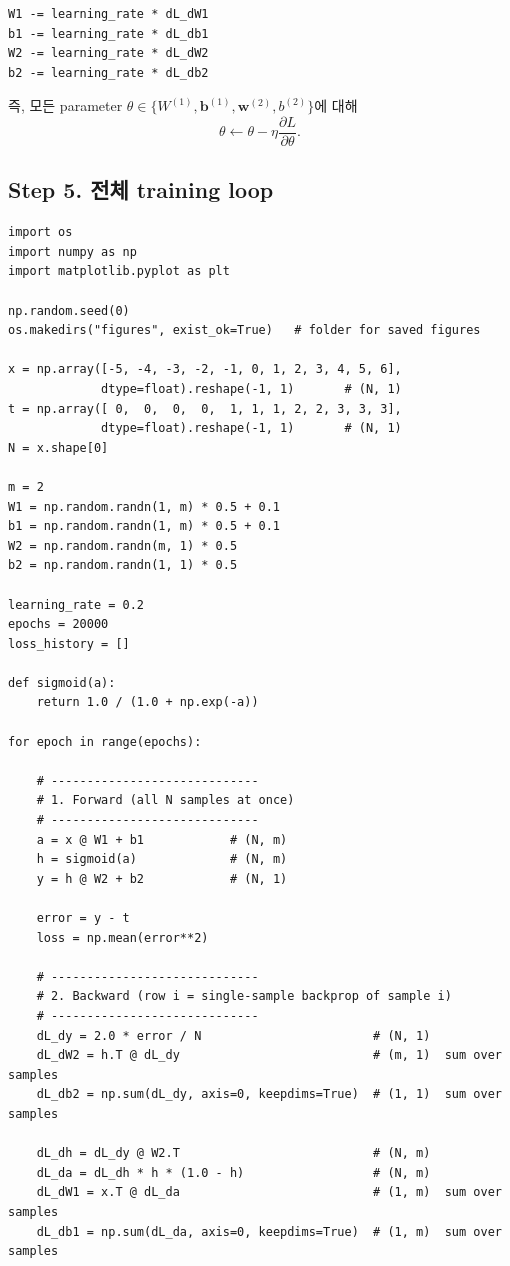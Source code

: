 \documentclass[11pt,a4paper]{article}
\newcommand{\vect}[1]{\bm{#1}}
\begin{document}
\begin{lstlisting}
W1 -= learning_rate * dL_dW1
b1 -= learning_rate * dL_db1
W2 -= learning_rate * dL_dW2
b2 -= learning_rate * dL_db2
\end{lstlisting}

즉, 모든 parameter $\theta\in\{W^{(1)},\vect{b}^{(1)},\vect{w}^{(2)},b^{(2)}\}$에 대해
\[
\theta\leftarrow\theta-\eta\frac{\partial L}{\partial \theta}.
\]

\subsection{Step 5. 전체 training loop}

\begin{lstlisting}
import os
import numpy as np
import matplotlib.pyplot as plt

np.random.seed(0)
os.makedirs("figures", exist_ok=True)   # folder for saved figures

x = np.array([-5, -4, -3, -2, -1, 0, 1, 2, 3, 4, 5, 6],
             dtype=float).reshape(-1, 1)       # (N, 1)
t = np.array([ 0,  0,  0,  0,  1, 1, 1, 2, 2, 3, 3, 3],
             dtype=float).reshape(-1, 1)       # (N, 1)
N = x.shape[0]

m = 2
W1 = np.random.randn(1, m) * 0.5 + 0.1
b1 = np.random.randn(1, m) * 0.5 + 0.1
W2 = np.random.randn(m, 1) * 0.5
b2 = np.random.randn(1, 1) * 0.5

learning_rate = 0.2
epochs = 20000
loss_history = []

def sigmoid(a):
    return 1.0 / (1.0 + np.exp(-a))

for epoch in range(epochs):

    # -----------------------------
    # 1. Forward (all N samples at once)
    # -----------------------------
    a = x @ W1 + b1            # (N, m)
    h = sigmoid(a)             # (N, m)
    y = h @ W2 + b2            # (N, 1)

    error = y - t
    loss = np.mean(error**2)

    # -----------------------------
    # 2. Backward (row i = single-sample backprop of sample i)
    # -----------------------------
    dL_dy = 2.0 * error / N                        # (N, 1)
    dL_dW2 = h.T @ dL_dy                           # (m, 1)  sum over samples
    dL_db2 = np.sum(dL_dy, axis=0, keepdims=True)  # (1, 1)  sum over samples

    dL_dh = dL_dy @ W2.T                           # (N, m)
    dL_da = dL_dh * h * (1.0 - h)                  # (N, m)
    dL_dW1 = x.T @ dL_da                           # (1, m)  sum over samples
    dL_db1 = np.sum(dL_da, axis=0, keepdims=True)  # (1, m)  sum over samples


\end{lstlisting}
\end{document}
